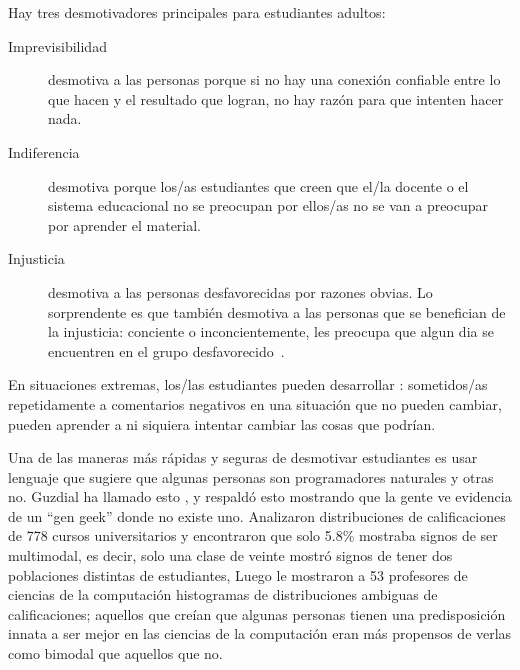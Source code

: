 Hay tres desmotivadores principales para estudiantes adultos:

\begin{description}

\item[Imprevisibilidad]
  desmotiva a las personas porque
  si no hay una conexión confiable entre lo que hacen y el resultado que logran,
  no hay razón para que intenten hacer nada.


\item[Indiferencia]
  desmotiva porque
  los/as estudiantes que creen que el/la docente o el sistema educacional no se preocupan por ellos/as
  no se van a preocupar por aprender el material.

\item[Injusticia]
  desmotiva a las personas desfavorecidas por razones obvias.
  Lo sorprendente es que también desmotiva a las personas que se benefician de la injusticia:
  conciente o inconcientemente,
  les preocupa que
  algun dia se encuentren en el grupo desfavorecido~\cite{Wilk2011}.

\end{description}

En situaciones extremas,
los/las estudiantes pueden desarrollar :
sometidos/as repetidamente a comentarios negativos en una situación que no pueden cambiar,
pueden aprender a ni siquiera intentar cambiar las cosas que podrían.

Una de las maneras más rápidas y seguras de desmotivar estudiantes es
usar lenguaje que sugiere que algunas personas son programadores naturales y otras no.
Guzdial ha llamado esto
,
y \cite{Pati2016} respaldó esto mostrando que
la gente ve evidencia de un ``gen geek'' donde no existe uno.
Analizaron distribuciones de calificaciones de 778 cursos universitarios y encontraron que solo 5.8\% mostraba signos
de ser multimodal,
es decir, solo una clase de veinte mostró signos de tener dos poblaciones distintas de estudiantes,
Luego le mostraron a 53 profesores de ciencias de la computación histogramas de distribuciones ambiguas de calificaciones;
aquellos que creían que algunas personas tienen una predisposición innata a ser mejor en las ciencias de la computación
eran más propensos de verlas como bimodal que aquellos que no.

